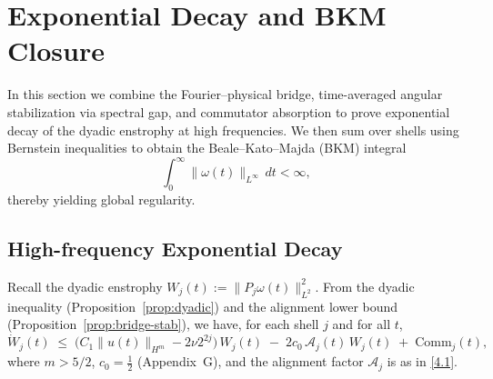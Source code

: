 \documentclass[11pt]{article}
\begin{document}
\section{Exponential Decay and BKM Closure}

In this section we combine the Fourier--physical bridge, time-averaged angular stabilization via spectral gap, and commutator absorption to prove exponential decay of the dyadic enstrophy at high frequencies. We then sum over shells using Bernstein inequalities to obtain the Beale--Kato--Majda (BKM) integral 
\[
\int_0^\infty \|\omega(t)\|_{L^\infty} \, dt < \infty,
\]
thereby yielding global regularity.

\subsection{High-frequency Exponential Decay}

Recall the dyadic enstrophy $W_j(t) := \|P_j \omega(t)\|_{L^2}^2$. From the dyadic inequality (Proposition~\ref{prop:dyadic}) and the alignment lower bound (Proposition~\ref{prop:bridge-stab}), we have, for each shell $j$ and for all $t$,
\begin{equation}
\dot{W}_j(t) \;\leq\; \big( C_1 \|u(t)\|_{H^m} - 2 \nu 2^{2j} \big) \, W_j(t) \;-\; 2 c_0 \, \mathcal{A}_j(t) \, W_j(t) \;+\; \mathrm{Comm}_j(t), \tag{5.1}
\end{equation}
where $m > 5/2$, $c_0 = \frac{1}{2}$ (Appendix~G), and the alignment factor $\mathcal{A}_j$ is as in \eqref{4.1}. 
\end{document}
